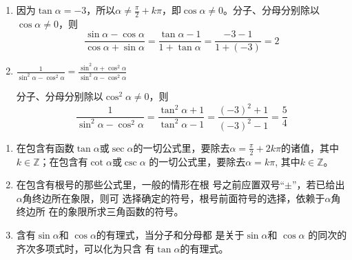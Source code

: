 \begin{solution}
\begin{enumerate}
    \item 因为$\tan\alpha=-3$，所以$\alpha\ne \frac{\pi}{2}+k\pi$，即$\cos\alpha\ne 0$。分子、分母分别除以$\cos\alpha\ne 0$，则
\[\frac{\sin\alpha-\cos\alpha}{\cos\alpha+\sin\alpha}=\frac{\tan\alpha-1}{1+\tan\alpha}=\frac{-3-1}{1+(-3)}=2\]    

\item $\frac{1}{\sin^2\alpha-\cos^2\alpha}=\frac{\sin^2\alpha+\cos^2\alpha}{\sin^2\alpha-\cos^2\alpha}$

分子、分母分别除以$\cos^2\alpha\ne 0$，则
\[\frac{1}{\sin^2\alpha-\cos^2\alpha}=\frac{\tan^2\alpha+1}{\tan^2\alpha-1}=\frac{(-3)^2+1}{(-3)^2-1}=\frac{5}{4}\]
\end{enumerate}  
\end{solution}



\begin{rmk}
\begin{enumerate}
    \item 在包含有函数$\tan\alpha$或$\sec\alpha$的一切公式里，要除去$\alpha=\frac{\pi}{2}+2k\pi$的诸值，其中$k\in\mathbb{Z}$；在包含有$\cot\alpha$或$\csc\alpha$
    的一切公式里，要除去$\alpha=k\pi$, 其中$k\in\mathbb{Z}$。
    \item 在包含有根号的那些公式里，一般的情形在根
    号之前应置双号“$\pm$”，若已给出$\alpha$角终边所在象限，则可
    选择确定的符号，根号前面符号的选择，依赖于$\alpha$角终边所
    在的象限所求三角函数的符号。
    \item 含有$\sin\alpha$和
    $\cos\alpha$的有理式，当分子和分母都
    是关于$\sin\alpha$和
    $\cos\alpha$
    的同次的齐次多项式时，可以化为只含
    有$\tan\alpha$的有理式。
\end{enumerate} 
\end{rmk}


